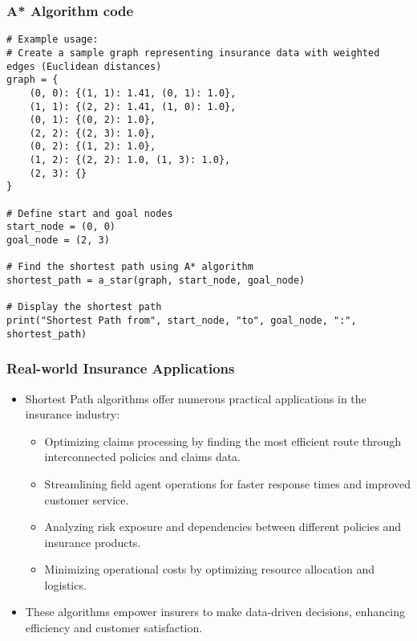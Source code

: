 \begin{frame}[fragile]\frametitle{A* Algorithm code}
{\tiny
\begin{lstlisting}
# Example usage:
# Create a sample graph representing insurance data with weighted edges (Euclidean distances)
graph = {
    (0, 0): {(1, 1): 1.41, (0, 1): 1.0},
    (1, 1): {(2, 2): 1.41, (1, 0): 1.0},
    (0, 1): {(0, 2): 1.0},
    (2, 2): {(2, 3): 1.0},
    (0, 2): {(1, 2): 1.0},
    (1, 2): {(2, 2): 1.0, (1, 3): 1.0},
    (2, 3): {}
}

# Define start and goal nodes
start_node = (0, 0)
goal_node = (2, 3)

# Find the shortest path using A* algorithm
shortest_path = a_star(graph, start_node, goal_node)

# Display the shortest path
print("Shortest Path from", start_node, "to", goal_node, ":", shortest_path)
\end{lstlisting}
}
\end{frame}


\begin{frame}[fragile]\frametitle{Real-world Insurance Applications}
\begin{itemize}
\item Shortest Path algorithms offer numerous practical applications in the insurance industry:
\begin{itemize}
\item Optimizing claims processing by finding the most efficient route through interconnected policies and claims data.
\item Streamlining field agent operations for faster response times and improved customer service.
\item Analyzing risk exposure and dependencies between different policies and insurance products.
\item Minimizing operational costs by optimizing resource allocation and logistics.
\end{itemize}
\item These algorithms empower insurers to make data-driven decisions, enhancing efficiency and customer satisfaction.
\end{itemize}
\end{frame}

